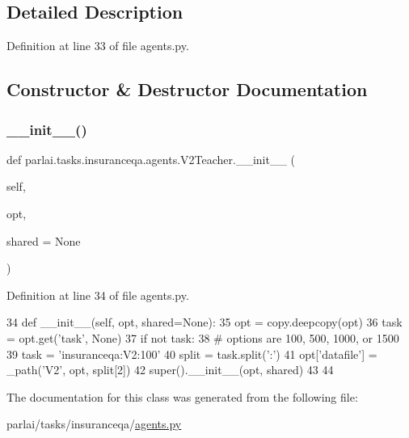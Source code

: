 \subsection{Detailed Description}


Definition at line 33 of file agents.\+py.



\subsection{Constructor \& Destructor Documentation}
\mbox{\label{classparlai_1_1tasks_1_1insuranceqa_1_1agents_1_1V2Teacher_aff5c049cb85ce4a1af8304373c908975}} 
\subsubsection{\texorpdfstring{\+\_\+\+\_\+init\+\_\+\+\_\+()}{\_\_init\_\_()}}
{\footnotesize\ttfamily def parlai.\+tasks.\+insuranceqa.\+agents.\+V2\+Teacher.\+\_\+\+\_\+init\+\_\+\+\_\+ (\begin{DoxyParamCaption}\item[{}]{self,  }\item[{}]{opt,  }\item[{}]{shared = {\ttfamily None} }\end{DoxyParamCaption})}



Definition at line 34 of file agents.\+py.


\begin{DoxyCode}
34     \textcolor{keyword}{def }\_\_init\_\_(self, opt, shared=None):
35         opt = copy.deepcopy(opt)
36         task = opt.get(\textcolor{stringliteral}{'task'}, \textcolor{keywordtype}{None})
37         \textcolor{keywordflow}{if} \textcolor{keywordflow}{not} task:
38             \textcolor{comment}{# options are 100, 500, 1000, or 1500}
39             task = \textcolor{stringliteral}{'insuranceqa:V2:100'}
40         split = task.split(\textcolor{stringliteral}{':'})
41         opt[\textcolor{stringliteral}{'datafile'}] = \_path(\textcolor{stringliteral}{'V2'}, opt, split[2])
42         super().\_\_init\_\_(opt, shared)
43 
44 
\end{DoxyCode}


The documentation for this class was generated from the following file\+:\begin{DoxyCompactItemize}
\item 
parlai/tasks/insuranceqa/\hyperlink{parlai_2tasks_2insuranceqa_2agents_8py}{agents.\+py}\end{DoxyCompactItemize}
